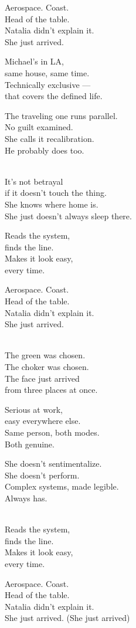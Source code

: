 \begin{lyrics}
Aerospace. %
Coast.\\
Head of the table.\\
Natalia didn't explain it.\\
She just arrived.

Michael's in LA,\\
same house, same time.\\
Technically exclusive —\\
that covers the defined life.

The traveling one runs parallel.\\
No guilt examined.\\
She calls it recalibration.\\
He probably does too.

\\
It's not betrayal\\
if it doesn't touch the thing.\\
She knows where home is.\\
She just doesn't always sleep there.

Reads the system,\\
finds the line.\\
Makes it look easy,\\
every time.

Aerospace. %
Coast.\\
Head of the table.\\
Natalia didn't explain it.\\
She just arrived.

\\
The green was chosen.\\
The choker was chosen.\\
The face just arrived\\
from three places at once.

Serious at work,\\
easy everywhere else.\\
Same person, both modes.\\
Both genuine.

She doesn't sentimentalize.\\
She doesn't perform.\\
Complex systems, made legible.\\
Always has.

\\
Reads the system,\\
finds the line.\\
Makes it look easy,\\
every time.

Aerospace. %
Coast.\\
Head of the table.\\
Natalia didn't explain it.\\
She just arrived. 
(She just arrived)

\end{lyrics}

